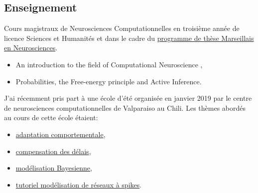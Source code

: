 \documentclass[10pt,french,a4paper,oneside]{article}%
\newcommand{\years}[1]{\marginpar{\textit{\scriptsize #1}}}
\begin{document}
\subsection{Enseignement} %

Cours magistraux de Neurosciences Computationnelles en  troisième année de licence Sciences et Humanités\years{2019} et dans le cadre du  \href{https://laurentperrinet.github.io/post/2018-03-26-cours-neuro-comp-fep/}{programme de thèse Marseillais en Neurosciences}\years{2018}.

\begin{itemize}
	\item An introduction to the field of Computational Neuroscience ,
	\item Probabilities, the Free-energy principle and Active Inference.
\end{itemize}


J'ai récemment pris part à une école d'été organisée en janvier 2019 par le centre de neurosciences computationnelles de Valparaiso au Chili. Les thèmes abordés au cours de cette école étaient:
\begin{itemize}
	\item \href{https://laurentperrinet.github.io/talk/2019-01-18-laconeu/}{adaptation comportementale},
	\item \href{https://laurentperrinet.github.io/talk/2019-01-17-laconeu/}{compensation des délais},
	\item \href{https://laurentperrinet.github.io/talk/2019-01-16-laconeu/}{modélisation Bayesienne},
	\item \href{https://laurentperrinet.github.io/talk/2019-01-14-laconeu/}{tutoriel modélisation de réseaux à spikes}.

\end{itemize}

%
%
%
%
%
\end{document}

